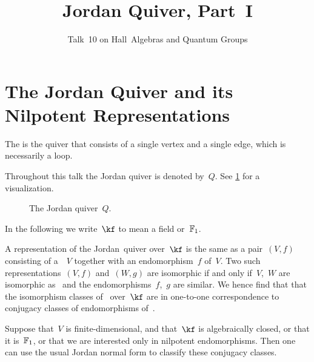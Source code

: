 \documentclass[a4paper,11pt]{scrartcl}
\title{Jordan Quiver, Part~I}
\subtitle{Talk~10 on Hall~Algebras and Quantum Groups}
\author{}
\date{}
\begin{document}
\maketitle

\vspace{-4em}





\section{The Jordan Quiver and its Nilpotent Representations}

\begin{definition}
  The  is the quiver that consists of a single vertex and a single edge, which is necessarily a loop.
\end{definition}

Throughout this talk the Jordan quiver is denoted by~$Q$.
See \cref{jordan quiver} for a visualization.
\begin{figure}[tb]
  \centering
  \caption{The Jordan quiver~$Q$.}
  \label{jordan quiver}
\end{figure}
In the following we write~$\kf$ to mean a field or~$\mathbb{F}_1$.

A representation of the Jordan~quiver over~$\kf$ is the same as a pair~$(V,f)$ consisting of a~\vectorspace{$\kf$}~$V$ together with an endomorphism~$f$ of~$V$.
Two such representations~$(V, f)$ and~$(W, g)$ are isomorphic if and only if~$V$,~$W$ are isomorphic as~\vectorspaces{$\kf$} and the endomorphisms~$f$,~$g$ are similar.
We hence find that that the isomorphism classes of~ over~$\kf$ are in one-to-one correspondence to conjugacy classes of endomorphisms of~\vectorspaces{$\kf$}.

Suppose that~$V$ is finite-dimensional, and that~$\kf$ is algebraically closed, or that it is~$\mathbb{F}_1$, or that we are interested only in nilpotent endomorphisms.
Then one can use the usual Jordan normal form to classify these conjugacy classes.
\end{document}
